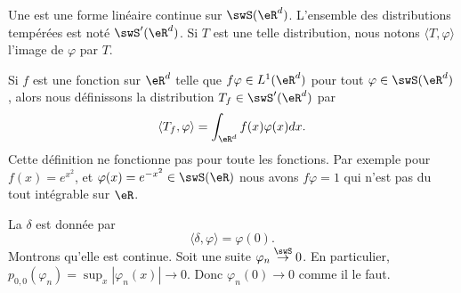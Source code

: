 \begin{definition}
    Une  est une forme linéaire continue sur \( \swS(\eR^d)\). L'ensemble des distributions tempérées est noté \( \swS'(\eR^d)\). Si \( T\) est une telle distribution, nous notons $\langle T, \varphi\rangle$ l'image de \( \varphi\) par \( T\).
\end{definition}

Si \( f\) est une fonction sur \( \eR^d\) telle que \( f\varphi\in L^1(\eR^d)\) pour tout \( \varphi\in \swS(\eR^d)\), alors nous définissons la distribution \( T_f\in\swS'(\eR^d)\) par
\begin{equation}
    \langle T_f, \varphi\rangle =\int_{\eR^d}f(x)\varphi(x)dx.
\end{equation}
Cette définition ne fonctionne pas pour toute les fonctions. Par exemple pour \( f(x)= e^{x^2}\), et \( \varphi(x)= e^{-x^2}\in\swS(\eR)\) nous avons \( f\varphi=1\) qui n'est pas du tout intégrable sur \( \eR\).

\begin{example}
    La  \( \delta\) est donnée par
    \begin{equation}
        \langle \delta, \varphi\rangle =\varphi(0).
    \end{equation}
    Montrons qu'elle est continue. Soit une suite \( \varphi_n\stackrel{\swS}{\to}0\). En particulier, \( p_{0,0}(\varphi_n)=\sup_x| \varphi_n(x) |\to 0\). Donc \( \varphi_n(0)\to 0\) comme il le faut.
\end{example}

